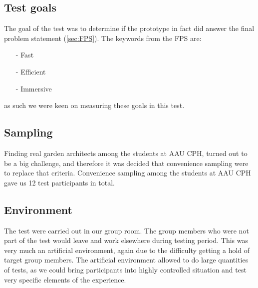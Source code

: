 \subsection{Test goals}
The goal of the test was to determine if the prototype in fact did answer the final problem statement (\autoref{sec:FPS}). The keywords from the FPS are:
\begin{itemize}
	\item[-] Fast
	\item[-] Efficient
	\item[-] Immersive
\end{itemize}
as such we were keen on measuring these goals in this test.
\subsection{Sampling}
Finding real garden architects among the students at AAU CPH, turned out to be a big challenge, and therefore it was decided that convenience sampling were to replace that criteria. Convenience sampling among the students at AAU CPH gave us 12 test participants in total.
\subsection{Environment}
The test were carried out in our group room. The group members who were not part of the test would leave and work elsewhere during testing period. This was very much an artificial environment, again due to the difficulty getting a hold of target group members. The artificial environment allowed to do large quantities of tests, as we could bring participants into highly controlled situation and test very specific elements of the experience.\cite[p.~64]{bjoernerBog}
